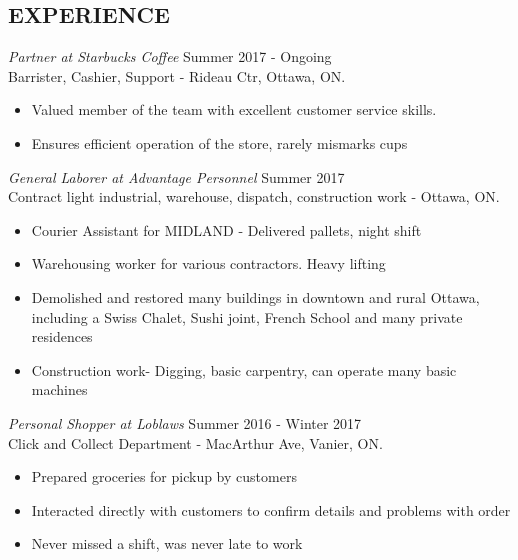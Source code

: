 \documentclass[margin]{res}
\begin{document}
\begin{resume}
\section{EXPERIENCE} {\sl Partner at Starbucks Coffee} \hfill Summer 2017 - Ongoing \\
                Barrister, Cashier, Support - Rideau Ctr, Ottawa, ON.
                 \begin{itemize}  \itemsep -2pt %
                 \item Valued member of the team with excellent customer service skills.
                \item  Ensures efficient operation of the store, rarely mismarks cups
                \end{itemize}
 
 {\sl General Laborer at Advantage Personnel} \hfill    Summer 2017 \\
                Contract light industrial, warehouse, dispatch, construction work - Ottawa, ON.
                 \begin{itemize}  \itemsep -2pt %
                 \item Courier Assistant for MIDLAND - Delivered pallets, night shift
                 \item Warehousing worker for various contractors. Heavy lifting
                 \item Demolished and restored many buildings in downtown and rural Ottawa, including a Swiss Chalet, Sushi joint, French School and many private residences
\item Construction work- Digging, basic carpentry, can operate many basic machines
                 \end{itemize} 
 
 
 
                {\sl Personal Shopper at Loblaws} \hfill            Summer 2016 - Winter 2017 \\
                Click and Collect Department - MacArthur Ave, Vanier, ON.
                 \begin{itemize}  \itemsep -2pt %
                 \item Prepared groceries for pickup by customers
                 \item Interacted directly with customers to confirm details and problems with order
                 \item Never missed a shift, was never late to work
                 \end{itemize} 
                 

\end{resume}
\end{document}
